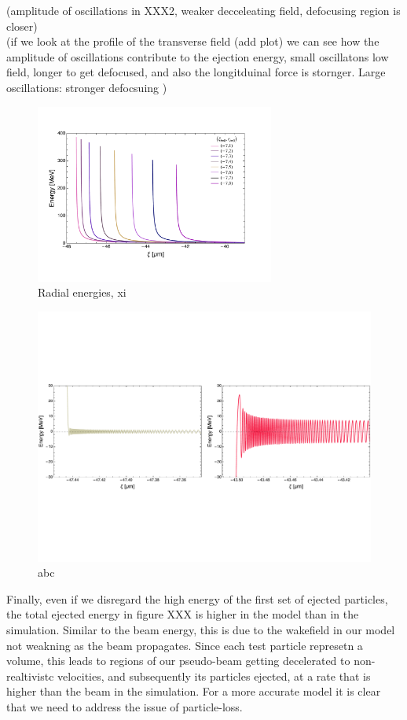(amplitude of oscillations in XXX2, weaker decceleating field, defocusing region is closer)\\
(if we look at the profile of the transverse field (add plot) we can see how the amplitude of oscillations contribute to the ejection energy, small oscillatons low field, longer to get defocused, and also the longitduinal force is stornger. Large oscillations: stronger defocsuing )
\begin{figure}
\centering
\includegraphics[width=0.7\textwidth]{RadialEnergies}
\caption{Radial energies, xi}
\label{Radial Energies}
\end{figure}
\begin{figure}
\centering
\includegraphics[width=\textwidth]{RadialOscillations}
\caption{abc}
\label{Radial Energies}
\end{figure}

Finally, even if we disregard the high energy of the first set of ejected particles, the total ejected energy in figure XXX is higher in the model than in the simulation. Similar to the beam energy, this is due to the wakefield in our model not weakning as the beam propagates. Since each test particle represetn a volume, this leads to regions of our pseudo-beam getting decelerated to non-realtivistc velocities, and subsequently its particles ejected, at a rate that is higher than the beam in the simulation. For a more accurate model it is clear that we need to address the issue of particle-loss.
